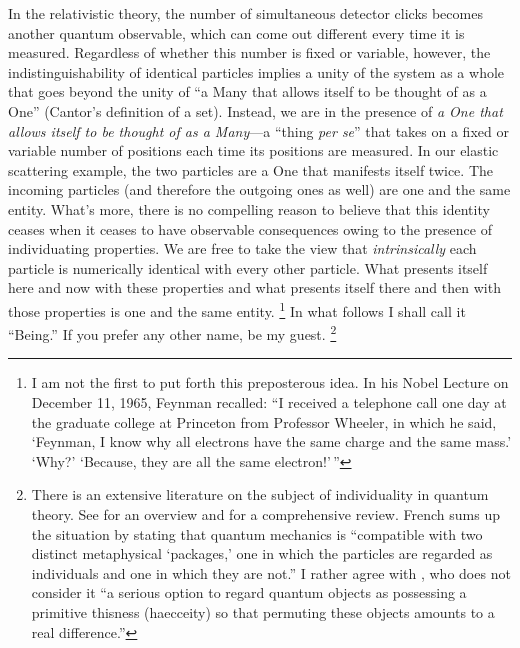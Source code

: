In the relativistic theory, the number of simultaneous detector clicks becomes another quantum observable, which can come out different every time it is measured. Regardless of whether this number is fixed or variable, however, the indistinguishability of identical particles implies a unity of the system as a whole that goes beyond the unity of ``a Many that allows itself to be thought of as a One'' (Cantor's definition of a set). Instead, we are in the presence of \emph{a One that allows itself to be thought of as a Many}---a ``thing \emph{per se}'' that takes on a fixed or variable number of positions each time its positions are measured. In our elastic scattering example, the two particles are a One that manifests itself twice. The incoming particles (and therefore the outgoing ones as well) are one and the same entity. What's more, there is no compelling reason to believe that this identity ceases when it ceases to have observable consequences owing to the presence of individuating properties. We are free to take the view that \emph{intrinsically} each particle is numerically identical with every other particle. What presents itself here and now with these properties and what presents itself there and then with those properties is one and the same entity.%
\footnote{I am not the first to put forth this preposterous idea. In his Nobel Lecture  on December 11, 1965, Feynman recalled: ``I received a telephone call one day at the graduate college at Princeton from Professor Wheeler, in which he said, `Feynman, I know why all electrons have the same charge and the same mass.' `Why?' `Because, they are all the same electron!'\,''}
In what follows I shall call it ``Being.'' If you prefer any other name, be my guest.%
\footnote{There is an extensive literature on the subject of individuality in quantum theory. See \citet{French} for an overview and \citet{FrenchKrause} for a comprehensive review. French sums up the situation by stating that quantum mechanics is ``compatible with two distinct metaphysical `packages,' one in which the particles are regarded as individuals and one in which they are not.'' I rather agree with \citet{Esfeld}, who does not consider it ``a serious option to regard quantum objects as possessing a primitive thisness (haecceity) so that permuting these objects amounts to a real difference.''}

